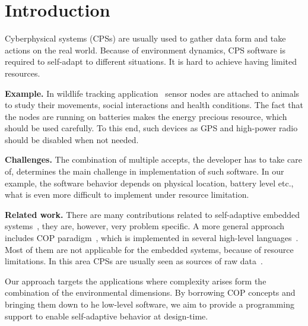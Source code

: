 \section{Introduction}
Cyberphysical systems (CPSs) are usually used to gather data form and take
actions on the real world. Because of environment dynamics, CPS software is
required to self-adapt to different situations. It is hard to achieve having
limited resources.

{\bfseries Example.} In wildlife tracking application~\cite{Pasztor10} sensor
nodes are attached to animals to study their movements, social interactions and
health conditions. The fact that the nodes are running on batteries makes the
energy precious resource, which should be used carefully. To this end, such
devices as GPS and high-power radio should be disabled when not needed.

{\bfseries Challenges.} The combination of multiple accepts, the developer has
to take care of, determines the main challenge in implementation of such
software. In our example, the software behavior depends on physical location,
battery level etc., what is even more difficult to implement under resource
limitation.

{\bfseries Related work.} There are many contributions related to self-adaptive
embedded systems~\cite{Zimmerling12,Bourdenas11}, they are, however, very
problem specific. A more general approach includes COP
paradigm~\cite{Hirschfeld08}, which is implemented in several high-level
languages~\cite{Bardram05,Ghezzi10,Kamina11,Salvaneschi12,Sehic11}. Most of them
are not applicable for the embedded systems, because of resource limitations. In
this area CPSs are usually seen as sources of raw data~\cite{Sehic11}.

Our approach targets the applications where complexity arises form the
combination of the environmental dimensions. By borrowing COP concepts and
bringing them down to he low-level software, we aim to provide a programming
support to enable self-adaptive behavior at design-time.

